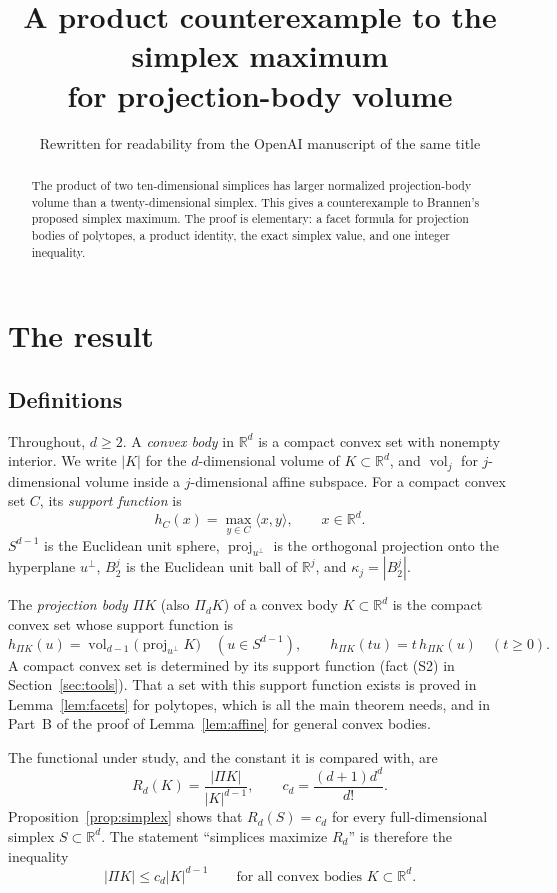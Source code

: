 \documentclass[11pt]{article}
\title{A product counterexample to the simplex maximum\\
for projection-body volume}
\author{Rewritten for readability from the OpenAI manuscript of the same title}
\date{}
\newcommand{\R}{\mathbb R}
\DeclareMathOperator{\vol}{vol}
\DeclareMathOperator{\proj}{proj}
\begin{document}
\maketitle

\begin{abstract}
The product of two ten-dimensional simplices has larger normalized
projection-body volume than a twenty-dimensional simplex. This gives
a counterexample to Brannen's proposed simplex maximum. The proof is
elementary: a facet formula for projection bodies of polytopes, a
product identity, the exact simplex value, and one integer inequality.
\end{abstract}

\section{The result}\label{sec:result}

\subsection{Definitions}

Throughout, \(d\ge2\). A \emph{convex body} in \(\R^d\) is a compact
convex set with nonempty interior. We write \(|K|\) for the
\(d\)-dimensional volume of \(K\subset\R^d\), and \(\vol_j\) for
\(j\)-dimensional volume inside a \(j\)-dimensional affine subspace.
For a compact convex set \(C\), its \emph{support function} is
\[
 h_C(x)=\max_{y\in C}\langle x,y\rangle,\qquad x\in\R^d .
\]
\(S^{d-1}\) is the Euclidean unit sphere, \(\proj_{u^\perp}\) is the
orthogonal projection onto the hyperplane \(u^\perp\), \(B_2^j\) is the
Euclidean unit ball of \(\R^j\), and \(\kappa_j=|B_2^j|\).

The \emph{projection body} \(\Pi K\) (also \(\Pi_dK\)) of a convex body
\(K\subset\R^d\) is the compact convex set whose support function is
\[
 h_{\Pi K}(u)=\vol_{d-1}\bigl(\proj_{u^\perp}K\bigr)
 \quad(u\in S^{d-1}),
 \qquad
 h_{\Pi K}(tu)=t\,h_{\Pi K}(u)\quad(t\ge0).
\]
A compact convex set is determined by its support function (fact (S2)
in Section~\ref{sec:tools}). That a set with this support function
exists is proved in Lemma~\ref{lem:facets} for polytopes, which is all
the main theorem needs, and in Part~B of the proof of
Lemma~\ref{lem:affine} for general convex bodies.

The functional under study, and the constant it is compared with, are
\begin{equation}\label{eq:functional}
 R_d(K)=\frac{|\Pi K|}{|K|^{d-1}},
 \qquad c_d=\frac{(d+1)d^d}{d!}.
\end{equation}
Proposition~\ref{prop:simplex} shows that \(R_d(S)=c_d\) for every
full-dimensional simplex \(S\subset\R^d\). The statement ``simplices
maximize \(R_d\)'' is therefore the inequality
\begin{equation}\label{eq:proposed-bound}
 |\Pi K|\le c_d|K|^{d-1}\qquad\text{for all convex bodies }K\subset\R^d .
\end{equation}
\end{document}

